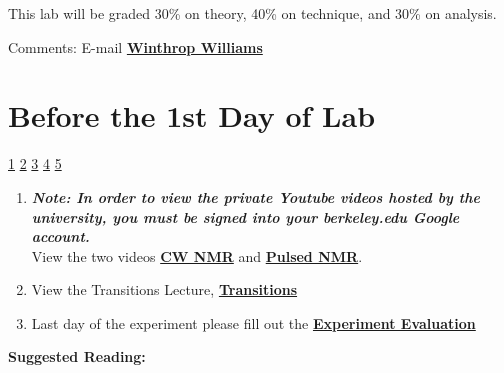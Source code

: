 \documentclass{../lab}
\begin{document}
This lab will be graded 30\% on theory, 40\% on technique, and 30\% on analysis.

Comments: E-mail \href{\MailLabManager}{\textbf{Winthrop Williams}}

\section{Before the 1st Day of Lab}

\signatures \hyperlink{Resonance Condition and Symmetry}{1} \hyperlink{Setup Pictures}{2} \hyperlink{CW Setup}{3} \hyperlink{Scanning Frequency}{4} \hyperlink{Mn Sample Traces}{5} 

\begin{enumerate}
    \item \emph{\textbf{Note: In order to view the private Youtube videos hosted by the university, you must be signed into your berkeley.edu Google account.}}\\
    View the two videos \href{http://youtu.be/q\_Rtbr7YEJY}{\textbf{CW NMR}} and \href{http://youtu.be/\_sXDn-ChOUY}{\textbf{Pulsed NMR}}.

    \item View the Transitions Lecture, \href{http://youtu.be/xOMgdVP3AfE}{\textbf{Transitions}}

    \item Last day of the experiment please fill out the \href{\ExperimentEvaluation}{\textbf{Experiment Evaluation}}

\end{enumerate}

\textbf{Suggested Reading:}
\end{document}
